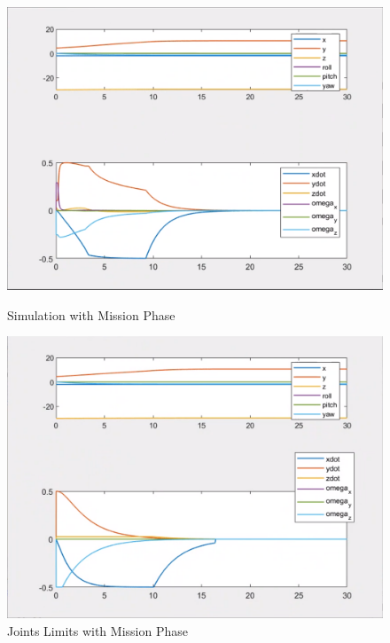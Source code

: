 \documentclass{article}
\begin{document}

\begin{figure}[htpb] 
\begin{minipage}{0.40\textwidth}  
\includegraphics[width=\textwidth]{522_wout_MP.png}
\caption{Simulation with Mission Phase}\label{522_n1} 
\end{minipage}  
\hspace{0.2\textwidth} 
\begin{minipage}{0.40\textwidth}  
\includegraphics[width=\textwidth]{522_w_MP.png}
\caption{Joints Limits with Mission Phase}\label{522_n2} 
\end{minipage} 
\end{figure}
\clearpage
\end{document}
